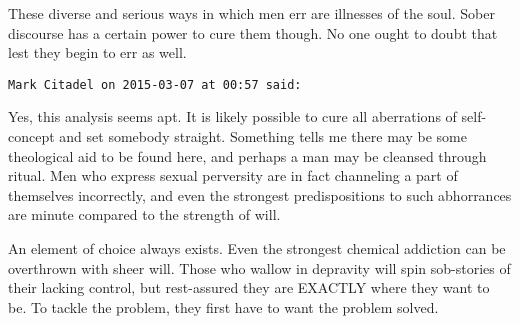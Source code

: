 \begin{footnotesize}
\begin{sffamily}
These diverse and serious ways in which men err are illnesses of the soul. Sober discourse has a certain power to cure them though. No one ought to doubt that lest they begin to err as well.


\hfill

\texttt{Mark Citadel on 2015-03-07 at 00:57 said: }

Yes, this analysis seems apt. It is likely possible to cure all aberrations of self-concept and set somebody straight. Something tells me there may be some theological aid to be found here, and perhaps a man may be cleansed through ritual. Men who express sexual perversity are in fact channeling a part of themselves incorrectly, and even the strongest predispositions to such abhorrances are minute compared to the strength of will.

An element of choice always exists. Even the strongest chemical addiction can be overthrown with sheer will. Those who wallow in depravity will spin sob-stories of their lacking control, but rest-assured they are EXACTLY where they want to be. To tackle the problem, they first have to want the problem solved.


\end{sffamily}\end{footnotesize}
